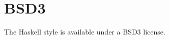 \documentclass[a4paper]{article}
\begin{document}




\section{BSD3}

The Haskell style is available under a BSD3 license.



\end{document}
